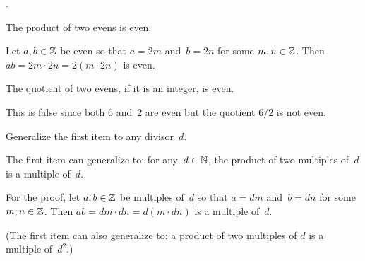 \documentclass{test}  %
\begin{document}
\begin{problem} 
\pord.
\begin{exes}
\begin{exercise}
  The product of two evens is even.
\end{exercise}
\begin{answer}
  Let $a,b\in\mathbb{Z}$ be even
  so that $a=2m$ and~$b=2n$ for some $m,n\in\mathbb{Z}$.
  Then $ab=2m\cdot 2n=2(m\cdot 2n)$ is even.  
\end{answer}

\begin{exercise}
  The quotient of two evens, if it is an integer, is even.
\end{exercise}
\begin{answer}
  This is false since both $6$ and~$2$ are even but the quotient $6/2$
  is not even.
\end{answer}

\begin{exercise}
  Generalize the first item to any divisor~$d$.  
\end{exercise}
\begin{answer}
  The first item can generalize to: for any~$d\in\mathbb{N}$, 
  the product of two multiples of~$d$ is a multiple of~$d$.

  For the proof,  let $a,b\in\mathbb{Z}$ be multiples of~$d$
  so that $a=dm$ and~$b=dn$ for some $m,n\in\mathbb{Z}$.
  Then $ab=dm\cdot dn=d(m\cdot dn)$ is a multiple of~$d$.

  (The first item can also generalize to: a product of two multiples of
  $d$ is a multiple of~$d^2$.)
\end{answer}


\end{exes}
\end{problem}
\end{document}
